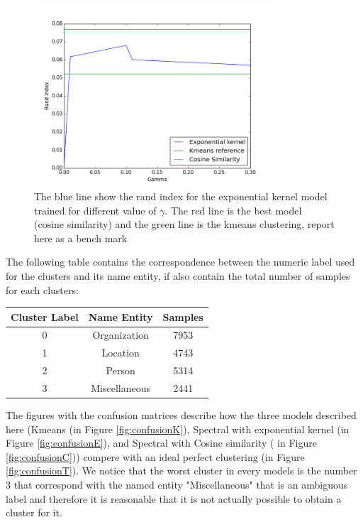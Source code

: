 \documentclass[]{article}
\begin{document}
	\begin{figure}
	\centering
	\includegraphics[width=0.8\textwidth]{Figures_Mik/results.png} 
	\caption{\label{fig:best} The blue line show the rand index for the  exponential kernel model trained for different value of $\gamma$. The red line is the best model (cosine similarity) and the green line is the kmeans clustering, report here as a bench mark } 
\end{figure}
The following table contains the correspondence between the numeric label used for the clusters and its name entity, if also contain the total number of samples for each clusters: 
\begin{center}
	\begin{tabular}{ |c|c|c|} 
		\hline
		Cluster Label & Name Entity & Samples\\
		\hline
	0 & Organization & 7953\\
		\hline
1 & Location & 4743\\
		\hline
 2 & Person & 5314\\
		\hline
 3 & Miscellaneous & 2441\\
		\hline
	\end{tabular}
\end{center}
The figures with the confusion matrices describe how the three models described here (Kmeans (in Figure \ref{fig:confusionK}), Spectral with exponential kernel (in Figure \ref{fig:confusionE}), and Spectral with Cosine similarity ( in Figure \ref{fig:confusionC})) compere with an ideal perfect clustering (in Figure \ref{fig:confusionT}). We notice that the worst cluster in every models is the number 3 that correspond with the named entity "Miscellaneous" that is an ambiguous label and therefore it is reasonable that it is not actually possible to obtain a cluster for it.
	
\end{document}
